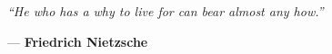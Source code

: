 \chapter*{}
\vspace*{\fill}

\begin{center}
\begin{minipage}{0.65\textwidth}
    \centering
    \itshape
    “He who has a why to live for can bear almost any how.”\par
    \vspace{1em}
    --- \textbf{Friedrich Nietzsche}
\end{minipage}
\end{center}

\vspace*{\fill}
\newpage